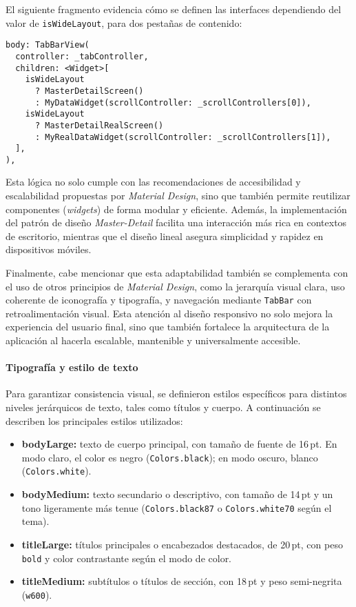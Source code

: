 El siguiente fragmento evidencia cómo se definen las interfaces dependiendo del valor de \texttt{isWideLayout}, para dos pestañas de contenido:

\begin{verbatim}
body: TabBarView(
  controller: _tabController,
  children: <Widget>[
    isWideLayout
      ? MasterDetailScreen()
      : MyDataWidget(scrollController: _scrollControllers[0]),
    isWideLayout
      ? MasterDetailRealScreen()
      : MyRealDataWidget(scrollController: _scrollControllers[1]),
  ],
),
\end{verbatim}

Esta lógica no solo cumple con las recomendaciones de accesibilidad y escalabilidad propuestas por \textit{Material Design}, sino que también permite reutilizar componentes (\textit{widgets}) de forma modular y eficiente. Además, la implementación del patrón de diseño \textit{Master-Detail} facilita una interacción más rica en contextos de escritorio, mientras que el diseño lineal asegura simplicidad y rapidez en dispositivos móviles.

Finalmente, cabe mencionar que esta adaptabilidad también se complementa con el uso de otros principios de \textit{Material Design}, como la jerarquía visual clara, uso coherente de iconografía y tipografía, y navegación mediante \texttt{TabBar} con retroalimentación visual. Esta atención al diseño responsivo no solo mejora la experiencia del usuario final, sino que también fortalece la arquitectura de la aplicación al hacerla escalable, mantenible y universalmente accesible.


\paragraph{Tipografía y estilo de texto}

Para garantizar consistencia visual, se definieron estilos específicos para distintos niveles jerárquicos de texto, tales como títulos y cuerpo. A continuación se describen los principales estilos utilizados:

\begin{itemize}
  \item \textbf{bodyLarge:} texto de cuerpo principal, con tamaño de fuente de 16\,pt. En modo claro, el color es negro (\texttt{Colors.black}); en modo oscuro, blanco (\texttt{Colors.white}).
  \item \textbf{bodyMedium:} texto secundario o descriptivo, con tamaño de 14\,pt y un tono ligeramente más tenue (\texttt{Colors.black87} o \texttt{Colors.white70} según el tema).
  \item \textbf{titleLarge:} títulos principales o encabezados destacados, de 20\,pt, con peso \texttt{bold} y color contrastante según el modo de color.
  \item \textbf{titleMedium:} subtítulos o títulos de sección, con 18\,pt y peso semi-negrita (\texttt{w600}).
\end{itemize}

